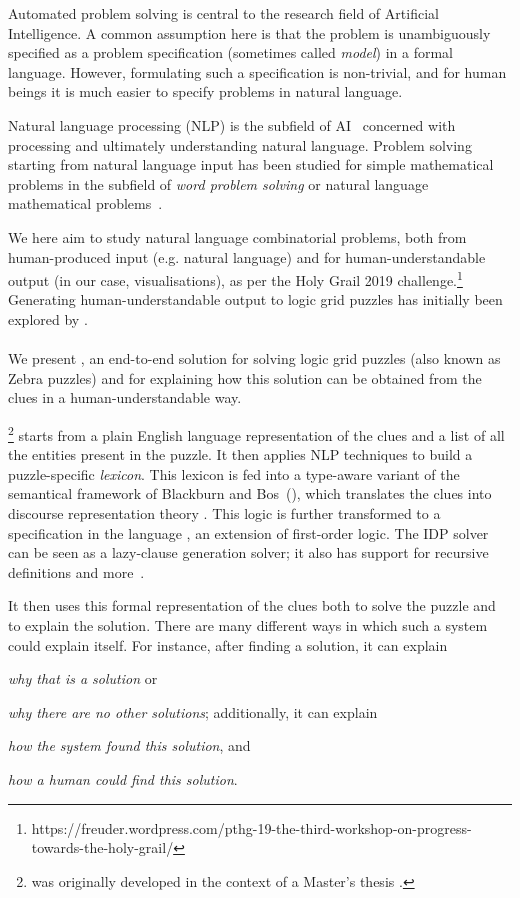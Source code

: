 Automated problem solving is central to the research field of Artificial Intelligence. A common assumption here is that the problem is unambiguously specified as a problem specification (sometimes called \textit{model}) in a formal language. However, formulating such a specification is non-trivial, and for human beings it is much easier to specify problems in natural language.

Natural language processing (NLP) is the subfield of AI~\cite{manning1999foundations} concerned with processing and ultimately understanding natural language. Problem solving starting from natural language input has been studied for simple mathematical problems in the subfield of \textit{word problem solving} or natural language mathematical problems~\cite{Mukherjee2008}.

We here aim to study natural language combinatorial problems, both from human-produced input (e.g. natural language) and for human-understandable output (in our case, visualisations), as per the Holy Grail 2019 challenge.\footnote{https://freuder.wordpress.com/pthg-19-the-third-workshop-on-progress-towards-the-holy-grail/} Generating human-understandable output to logic grid puzzles has initially been explored by \citet{sqalli1996inference}.

\paragraph{}
We present \ourtool,  an end-to-end solution for solving logic grid puzzles (also known as Zebra puzzles) and for explaining how this solution can be obtained from the clues in a human-understandable way. 

\ourtool\footnote{\ourtool was originally developed in the context of a Master's thesis \cite{msc/Claes17}.} starts from a plain English language representation of the clues and a list of all the entities present in the puzzle. It then applies NLP techniques to build a puzzle-specific \textit{lexicon}. This lexicon is fed into a type-aware variant of the semantical framework of Blackburn and Bos~(\citeyear{Blackburn2005,Blackburn2006}), which translates the clues into discourse representation theory \cite{DRT}. This logic is further transformed to a specification in the \idp language , an extension of first-order logic. The IDP solver can be seen as a lazy-clause generation solver; it also has support for recursive definitions and more~\cite{idp}.

It then uses this formal representation of the clues both to solve the puzzle and to explain the solution. 
There are many different ways in which such a system could explain itself. For instance, after finding a solution, it can explain \begin{inparaenum}\item \emph{why that is a solution} or \item \emph{why there are no other solutions}; additionally, it can explain \item \emph{how the system found this solution}, and \item \emph{how a human could find this solution}. \end{inparaenum}

